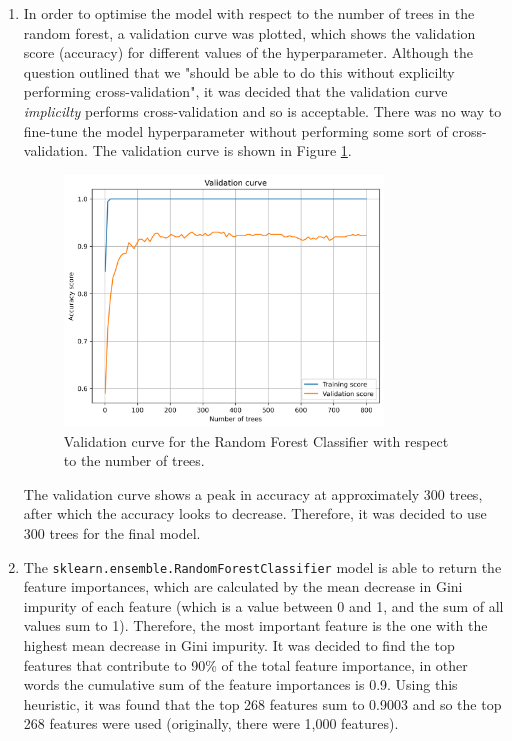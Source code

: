 \documentclass{article}
\begin{document}
\begin{enumerate}[label=\alph*)]
    \item In order to optimise the model with respect to the number of trees in the random forest, a validation curve was plotted, which shows the validation score (accuracy) for different values of the hyperparameter. Although the question outlined that we "should be able to do this without explicilty performing cross-validation", it was decided that the validation curve \textit{implicilty} performs cross-validation and so is acceptable. There was no way to fine-tune the model hyperparameter without performing some sort of cross-validation. The validation curve is shown in Figure \ref{fig:Q4d_validation_curve}.
    \begin{figure}[!htb]
        \centering
        \includegraphics[width=0.8\textwidth]{Q4d_validation_curve.png}
        \caption{Validation curve for the Random Forest Classifier with respect to the number of trees.}
        \label{fig:Q4d_validation_curve}
    \end{figure}
    The validation curve shows a peak in accuracy at approximately 300 trees, after which the accuracy looks to decrease. Therefore, it was decided to use 300 trees for the final model.

    \item The \verb|sklearn.ensemble.RandomForestClassifier| model is able to return the feature importances, which are calculated by the mean decrease in Gini impurity of each feature (which is a value between 0 and 1, and the sum of all values sum to 1). Therefore, the most important feature is the one with the highest mean decrease in Gini impurity. It was decided to find the top features that contribute to 90\% of the total feature importance, in other words the cumulative sum of the feature importances is 0.9. Using this heuristic, it was found that the top 268 features sum to 0.9003 and so the top 268 features were used (originally, there were 1,000 features).
    

\end{enumerate}
\end{document}
